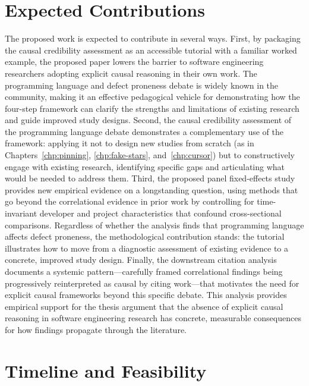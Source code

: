\section{Expected Contributions}

The proposed work is expected to contribute in several ways.
First, by packaging the causal credibility assessment as an accessible tutorial with a familiar worked example, the proposed paper lowers the barrier to software engineering researchers adopting explicit causal reasoning in their own work.
The programming language and defect proneness debate is widely known in the community, making it an effective pedagogical vehicle for demonstrating how the four-step framework can clarify the strengths and limitations of existing research and guide improved study designs.
Second, the causal credibility assessment of the programming language debate demonstrates a complementary use of the framework: applying it not to design new studies from scratch (as in Chapters~\ref{chp:pinning}, \ref{chp:fake-stars}, and~\ref{chp:cursor}) but to constructively engage with existing research, identifying specific gaps and articulating what would be needed to address them.
Third, the proposed panel fixed-effects study provides new empirical evidence on a longstanding question, using methods that go beyond the correlational evidence in prior work by controlling for time-invariant developer and project characteristics that confound cross-sectional comparisons.
Regardless of whether the analysis finds that programming language affects defect proneness, the methodological contribution stands: the tutorial illustrates how to move from a diagnostic assessment of existing evidence to a concrete, improved study design.
Finally, the downstream citation analysis documents a systemic pattern---carefully framed correlational findings being progressively reinterpreted as causal by citing work---that motivates the need for explicit causal frameworks beyond this specific debate.
This analysis provides empirical support for the thesis argument that the absence of explicit causal reasoning in software engineering research has concrete, measurable consequences for how findings propagate through the literature.

\section{Timeline and Feasibility}
\label{sec:proposed-timeline}

